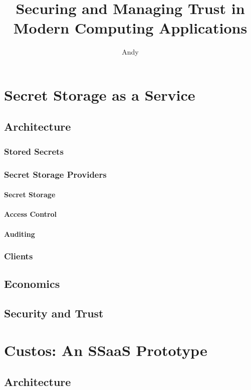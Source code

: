 \documentclass[defaultstyle,11pt]{thesis}
\title{Securing and Managing Trust in Modern Computing Applications}
\author{Andy}{Sayler}
\begin{document}








%
\chapter{Secret Storage as a Service}
\label{chap:ssaas}

\section{Architecture}
\subsection{Stored Secrets}
\subsection{Secret Storage Providers}
\subsubsection{Secret Storage}
\subsubsection{Access Control}
\subsubsection{Auditing}
\subsection{Clients}
\section{Economics}
\section{Security and Trust}

%
\chapter{Custos: An SSaaS Prototype}
\label{chap:custos}

\section{Architecture}
\end{document}
